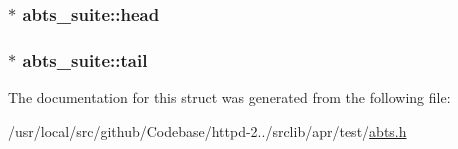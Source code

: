 \subsubsection[{\texorpdfstring{head}{head}}]{ $\ast$ abts\+\_\+suite\+::head}\hypertarget{structabts__suite_aeecd85d4cd56321c38ff5fe14b9fcd97}{}\label{structabts__suite_aeecd85d4cd56321c38ff5fe14b9fcd97}
\subsubsection[{\texorpdfstring{tail}{tail}}]{ $\ast$ abts\+\_\+suite\+::tail}\hypertarget{structabts__suite_a853a74cb297bbb7a8c3fc7b86c8e0551}{}\label{structabts__suite_a853a74cb297bbb7a8c3fc7b86c8e0551}


The documentation for this struct was generated from the following file\+:\begin{DoxyCompactItemize}
\item 
/usr/local/src/github/\+Codebase/httpd-\/2../srclib/apr/test/\hyperlink{test_2abts_8h}{abts.\+h}\end{DoxyCompactItemize}

